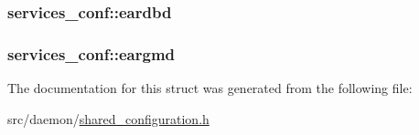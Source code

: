 \subsubsection[{\texorpdfstring{eardbd}{eardbd}}]{ services\+\_\+conf\+::eardbd}\hypertarget{structservices__conf_ae1e895640252a923c4df253d1116e17f}{}\label{structservices__conf_ae1e895640252a923c4df253d1116e17f}
\subsubsection[{\texorpdfstring{eargmd}{eargmd}}]{ services\+\_\+conf\+::eargmd}\hypertarget{structservices__conf_a548eebff8f4455edadd57275721aecac}{}\label{structservices__conf_a548eebff8f4455edadd57275721aecac}


The documentation for this struct was generated from the following file\+:\begin{DoxyCompactItemize}
\item 
src/daemon/\hyperlink{shared__configuration_8h}{shared\+\_\+configuration.\+h}\end{DoxyCompactItemize}
